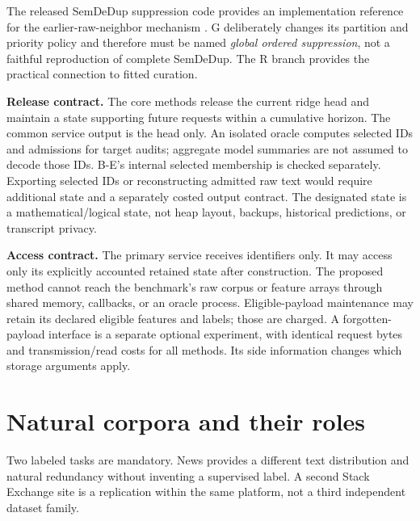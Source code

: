 \documentclass[11pt,a4paper]{article}
\begin{document}
The released SemDeDup suppression code provides an implementation reference for the earlier-raw-neighbor mechanism \cite{semcode}. G deliberately changes its partition and priority policy and therefore must be named \emph{global ordered suppression}, not a faithful reproduction of complete SemDeDup. The R branch provides the practical connection to fitted curation.

\textbf{Release contract.} The core methods release the current ridge head and maintain a state supporting future requests within a cumulative horizon. The common service output is the head only. An isolated oracle computes selected IDs and admissions for target audits; aggregate model summaries are not assumed to decode those IDs. B-E's internal selected membership is checked separately. Exporting selected IDs or reconstructing admitted raw text would require additional state and a separately costed output contract. The designated state is a mathematical/logical state, not heap layout, backups, historical predictions, or transcript privacy.

\textbf{Access contract.} The primary service receives identifiers only. It may access only its explicitly accounted retained state after construction. The proposed method cannot reach the benchmark's raw corpus or feature arrays through shared memory, callbacks, or an oracle process. Eligible-payload maintenance may retain its declared eligible features and labels; those are charged. A forgotten-payload interface is a separate optional experiment, with identical request bytes and transmission/read costs for all methods. Its side information changes which storage arguments apply.

\section{Natural corpora and their roles}
Two labeled tasks are mandatory. News provides a different text distribution and natural redundancy without inventing a supervised label. A second Stack Exchange site is a replication within the same platform, not a third independent dataset family.
\end{document}
